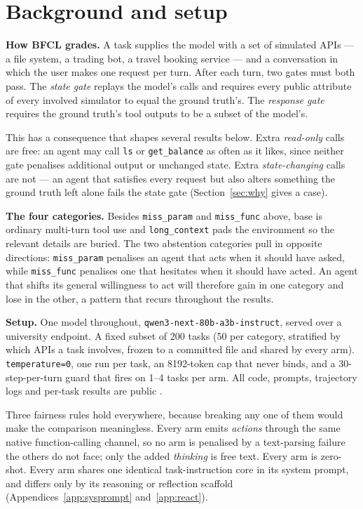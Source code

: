\documentclass[a4paper, 12pt]{article}
\begin{document}
\section{Background and setup}

\textbf{How BFCL grades.} A task supplies the model with a set of simulated APIs
--- a file system, a trading bot, a travel booking service --- and a
conversation in which the user makes one request per turn. After each turn, two
gates must both pass. The \emph{state gate} replays the model's calls and
requires every public attribute of every involved simulator to equal the ground
truth's. The \emph{response gate} requires the ground truth's tool outputs to be
a subset of the model's.

This has a consequence that shapes several results below. Extra
\emph{read-only} calls are free: an agent may call \texttt{ls} or
\texttt{get\_balance} as often as it likes, since neither gate penalises
additional output or unchanged state. Extra \emph{state-changing} calls are not
--- an agent that satisfies every request but also alters something the ground
truth left alone fails the state gate (Section~\ref{sec:why} gives a case).

\textbf{The four categories.} Besides \texttt{miss\_param} and \texttt{miss\_func}
above, base is ordinary multi-turn tool use and \texttt{long\_context} pads the environment
so the relevant details are buried. The two abstention categories pull in opposite directions:
\texttt{miss\_param} penalises an agent that acts when it should have asked, while \texttt{miss\_func}
penalises one that hesitates when it should have acted. An agent that shifts its general willingness
to act will therefore gain in one category and lose in the other, a pattern that recurs throughout the results.

\textbf{Setup.} One model throughout, \texttt{qwen3-next-80b-a3b-instruct},
served over a university endpoint. A fixed subset of 200 tasks
(50 per category, stratified by which APIs a task involves, frozen to a
committed file and shared by every arm). \texttt{temperature=0}, one run per
task, an 8192-token cap that never binds, and a 30-step-per-turn guard that
fires on 1--4 tasks per arm. All code, prompts, trajectory logs and per-task
results are public \cite{kamilov2026code}.

Three fairness rules hold everywhere, because breaking any one of them would
make the comparison meaningless. Every arm emits \emph{actions} through the same
native function-calling channel, so no arm is penalised by a text-parsing
failure the others do not face; only the added \emph{thinking} is free text.
Every arm is zero-shot. Every arm shares one identical task-instruction core in
its system prompt, and differs only by its reasoning or reflection scaffold
(Appendices~\ref{app:sysprompt} and~\ref{app:react}).
\end{document}
